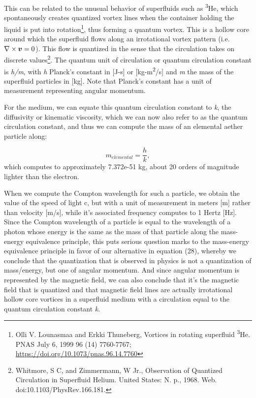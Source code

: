 \documentclass[a4paper]{article}
\newcommand\boldsubformula[1]{\text{\mathversion{bold}$#1$}}
\begin{document}
This can be related to the unusual behavior of superfluids such as \textsuperscript{3}He, which spontaneously creates
quantized vortex lines when the container holding the liquid is put into rotation\footnote{  Olli V. Lounasmaa and
Erkki Thuneberg, Vortices in rotating superfluid \textsuperscript{3}He. PNAS July 6, 1999 96 (14) 7760-7767;
\url{https://doi.org/10.1073/pnas.96.14.7760} \par }, thus forming a quantum vortex. This is a hollow core around which
the superfluid flows along an irrotational vortex pattern (i.e. $\nabla \times \boldsubformula v=0$). This flow is
quantized in the sense that the circulation takes on discrete values\footnote{ Whitmore, S C, and Zimmermann, W Jr.,
Observation of Quantized Circulation in Superfluid Helium. United States: N. p., 1968. Web.
doi:10.1103/PhysRev.166.181. \par }. The quantum unit of circulation or quantum circulation constant is \textit{h/m},
with \textit{h} Planck's constant in [J-s] or [kg-m\textsuperscript{2}/s] and \textit{m} the mass of the superfluid
particles in [kg].  Note that Planck{}'s constant has a unit of measurement representing angular momentum.

For the medium, we can equate this quantum circulation constant to \textit{k}, the diffusivity or kinematic viscosity,
which we can now also refer to as the quantum circulation constant, and thus we can compute the mass of an elemental
aether particle along:

\begin{equation}
m_{\mathit{elemental}}=\frac h k,
\end{equation}
which computes to approximately 7.372e-51 kg, about 20 orders of magnitude lighter than the electron. 

When we compute the Compton wavelength for such a particle, we obtain the value of the speed of light c, but with a unit
of measurement in meters [m] rather than velocity [m/s], while it's associated frequency computes to 1 Hertz [Hz].
Since the Compton wavelength of a particle is equal to the wavelength of a photon whose energy is the same as the mass
of that particle along the mass-energy equivalence principle, this puts serious question marks to the mass-energy
equivalence principle in favor of our alternative in equation (28), whereby we conclude that the quantization that is
observed in physics is not a quantization of mass/energy, but one of angular momentum. And since angular momentum is
represented by the magnetic field, we can also conclude that it's the magnetic field that is quantized and that
magnetic field lines are actually irrotational hollow core vortices in a superfluid medium with a circulation equal to
the quantum circulation constant \textit{k}. 
\end{document}

